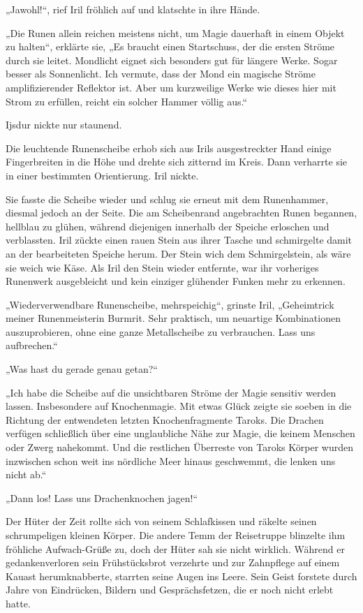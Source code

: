 „Jawohl!“, rief Iril fröhlich auf und klatschte in ihre Hände.

„Die Runen allein reichen meistens nicht, um Magie dauerhaft in einem Objekt zu halten“, erklärte sie, „Es braucht einen Startschuss, der die ersten Ströme durch sie leitet. Mondlicht eignet sich besonders gut für längere Werke. Sogar besser als Sonnenlicht. Ich vermute, dass der Mond ein magische Ströme amplifizierender Reflektor ist. Aber um kurzweilige Werke wie dieses hier mit Strom zu erfüllen, reicht ein solcher Hammer völlig aus.“

Ijsdur nickte nur staunend.

Die leuchtende Runenscheibe erhob sich aus Irils ausgestreckter Hand einige Fingerbreiten in die Höhe und drehte sich zitternd im Kreis. Dann verharrte sie in einer bestimmten Orientierung. Iril nickte.

Sie fasste die Scheibe wieder und schlug sie erneut mit dem Runenhammer, diesmal jedoch an der Seite. Die am Scheibenrand angebrachten Runen begannen, hellblau zu glühen, während diejenigen innerhalb der Speiche erloschen und verblassten. Iril zückte einen rauen Stein aus ihrer Tasche und schmirgelte damit an der bearbeiteten Speiche herum. Der Stein wich dem Schmirgelstein, als wäre sie weich wie Käse. Als Iril den Stein wieder entfernte, war ihr vorheriges Runenwerk ausgebleicht und kein einziger glühender Funken mehr zu erkennen.

„Wiederverwendbare Runenscheibe, mehrspeichig“, grinste Iril, „Geheimtrick meiner Runenmeisterin Burmrit. Sehr praktisch, um neuartige Kombinationen auszuprobieren, ohne eine ganze Metallscheibe zu verbrauchen. Lass uns aufbrechen.“

„Was hast du gerade genau getan?“

„Ich habe die Scheibe auf die unsichtbaren Ströme der Magie sensitiv werden lassen. Insbesondere auf Knochenmagie. Mit etwas Glück zeigte sie soeben in die Richtung der entwendeten letzten Knochenfragmente Taroks. Die Drachen verfügen schließlich über eine unglaubliche Nähe zur Magie, die keinem Menschen oder Zwerg nahekommt. Und die restlichen Überreste von Taroks Körper wurden inzwischen schon weit ins nördliche Meer hinaus geschwemmt, die lenken uns nicht ab.“

„Dann los! Lass uns Drachenknochen jagen!“



\trennzeichen



Der Hüter der Zeit rollte sich von seinem Schlafkissen und räkelte seinen schrumpeligen kleinen Körper. Die andere Temm der Reisetruppe blinzelte ihm fröhliche Aufwach-Grüße zu, doch der Hüter sah sie nicht wirklich. Während er gedankenverloren sein Frühstücksbrot verzehrte und zur Zahnpflege auf einem Kauast herumknabberte, starrten seine Augen ins Leere. Sein Geist forstete durch Jahre von Eindrücken, Bildern und Gesprächsfetzen, die er noch nicht erlebt hatte.

